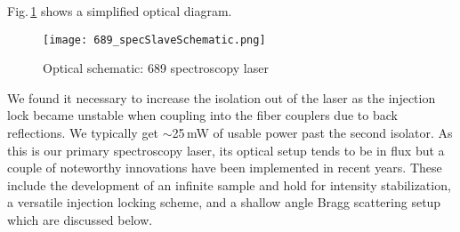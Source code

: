 Fig.\,\ref{fig:689specSch} shows a simplified optical diagram.
	\begin{figure}
	\centerline{
		\texttt{[image: 689\_specSlaveSchematic.png]}}
		\caption{Optical schematic: 689 spectroscopy laser}
		 \label{fig:689specSch}
	\end{figure}
We found it necessary to increase the isolation out of the laser as the injection lock became unstable when coupling into the fiber couplers due to back reflections.
We typically get $\sim$25\,mW of usable power past the second isolator.
As this is our primary spectroscopy laser, its optical setup tends to be in flux but a couple of noteworthy innovations have been implemented in recent years.
These include the development of an infinite sample and hold for intensity stabilization, a versatile injection locking scheme, and a shallow angle Bragg scattering setup which are discussed below.

